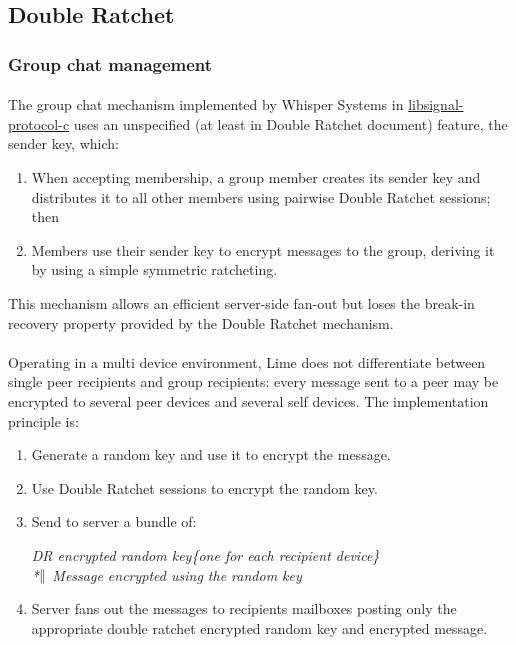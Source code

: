 \documentclass[a4paper,11pt]{article}
\begin{document}
  \subsection{Double Ratchet}
  \subsubsection{Group chat management}
    \label{subsubsec:groupchat}
    \paragraph*{}The group chat mechanism implemented by Whisper Systems in \href{https://github.com/WhisperSystems/libsignal-protocol-c}{libsignal-protocol-c}\cite{libsignal} uses an unspecified (at least in Double Ratchet document\cite{doubleRatchet}) feature, the sender key, which:
    \begin{enumerate}
      \item When accepting membership, a group member creates its sender key and distributes it to all other members using pairwise Double Ratchet sessions; then
      \item Members use their sender key to encrypt messages to the group, deriving it by using a simple symmetric ratcheting.
    \end{enumerate}
    This mechanism allows an efficient server-side fan-out but loses the break-in recovery property provided by the Double Ratchet mechanism.
    
    \paragraph*{}Operating in a multi device environment, Lime does not differentiate between single peer recipients and group recipients: every message sent to a peer may be encrypted to several peer devices and several self devices. The implementation principle is:
    \begin{enumerate}
      \item Generate a random key and use it to encrypt the message.
      \item Use Double Ratchet sessions to encrypt the random key.
      \item Send to server a bundle of:
        \begin{center}
          \textit{DR encrypted random key\{one for each recipient device\}\\*$\Arrowvert$ Message encrypted using the random key}
        \end{center}
      \item Server fans out the messages to recipients mailboxes posting only the appropriate double ratchet encrypted random key and encrypted message.
    \end{enumerate}
\end{document}
